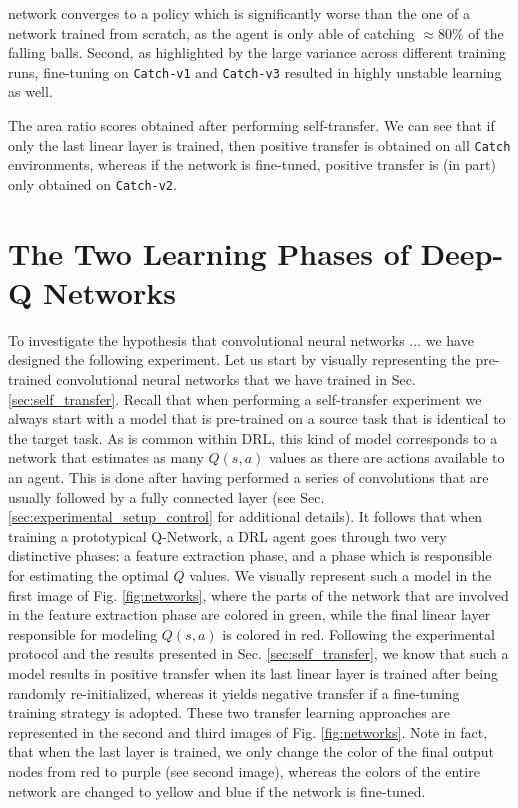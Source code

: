 network converges to a policy which is significantly worse than the one of a network trained from scratch, as the agent is only able of catching $\approx 80\%$ of the falling balls. Second, as highlighted by the large variance across different training runs, fine-tuning on \texttt{Catch-v1} and \texttt{Catch-v3} resulted in highly unstable learning as well.    



\begin{table}
	\centering
	\caption{The area ratio scores obtained after performing self-transfer. We can see that if only the last linear layer is trained, then positive transfer is obtained on all \texttt{Catch} environments, whereas if the network is fine-tuned, positive transfer is (in part) only obtained on \texttt{Catch-v2}.}
	
	\label{tab:self_tl_area_ratio}
\end{table}

\section{The Two Learning Phases of Deep-Q Networks}
\label{sec:hybrid_self_transfer}

To investigate the hypothesis that convolutional neural networks ... we have designed the following experiment. Let us start by visually representing the pre-trained convolutional neural networks that we have trained in Sec. \ref{sec:self_transfer}. Recall that when performing a self-transfer experiment we always start with a model that is pre-trained on a source task that is identical to the target task. As is common within DRL, this kind of model corresponds to a network that estimates as many $Q(s,a)$ values as there are actions available to an agent. This is done after having performed a series of convolutions that are usually followed by a fully connected layer (see Sec. \ref{sec:experimental_setup_control} for additional details). It follows that when training a prototypical Q-Network, a DRL agent goes through two very distinctive phases: a feature extraction phase, and a phase which is responsible for estimating the optimal $Q$ values. We visually represent such a model in the first image of Fig. \ref{fig:networks}, where the parts of the network that are involved in the feature extraction phase are colored in green, while the final linear layer responsible for modeling $Q(s,a)$ is colored in red. Following the experimental protocol and the results presented in Sec. \ref{sec:self_transfer}, we know that such a model results in positive transfer when its last linear layer is trained after being randomly re-initialized, whereas it yields negative transfer if a fine-tuning training strategy is adopted. These two transfer learning approaches are represented in the second and third images of Fig. \ref{fig:networks}. Note in fact, that when the last layer is trained, we only change the color of the final output nodes from red to purple (see second image), whereas the colors of the entire network are changed to yellow and blue if the network is fine-tuned.  


